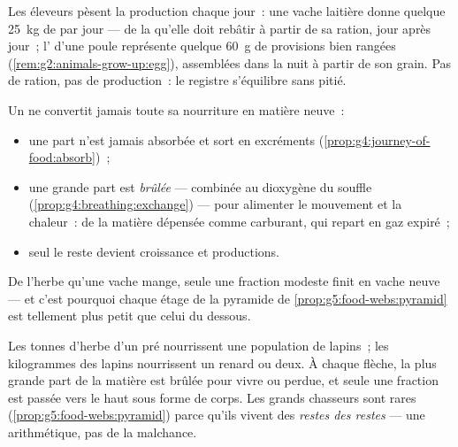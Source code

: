 \begin{example}\label{ex:g6:matter-from-food:weighing}
Les éleveurs pèsent la production chaque jour~: une vache laitière
donne quelque \qty{25}{kg} de  par jour --- de la  qu'elle doit rebâtir à partir de sa ration, jour après
jour~; l' d'une poule représente quelque \qty{60}{g} de
provisions bien rangées (\cref{rem:g2:animals-grow-up:egg}),
assemblées dans la nuit à partir de son grain. Pas de ration, pas de
production~: le registre s'équilibre sans pitié.
\end{example}

\begin{proposition}\label{prop:g6:matter-from-food:losses}
Un  ne convertit jamais toute sa nourriture en matière
neuve~:
\begin{itemize}
  \item une part n'est jamais absorbée et sort en excréments
        (\cref{prop:g4:journey-of-food:absorb})~;
  \item une grande part est \emph{brûlée} --- combinée au
        dioxygène du souffle
        (\cref{prop:g4:breathing:exchange}) --- pour alimenter le
        mouvement et la chaleur~: de la matière dépensée comme
        carburant, qui repart en gaz expiré~;
  \item seul le reste devient croissance et productions.
\end{itemize}
De l'herbe qu'une vache mange, seule une fraction modeste finit en
vache neuve --- et c'est pourquoi chaque étage de la pyramide de
\cref{prop:g5:food-webs:pyramid} est tellement plus petit que celui
du dessous.
\end{proposition}
\admitted

\begin{example}\label{ex:g6:matter-from-food:pyramid}
Les tonnes d'herbe d'un pré nourrissent une population de lapins~;
les kilogrammes des lapins nourrissent un renard ou deux. À chaque
flèche, la plus grande part de la matière est brûlée pour vivre ou
perdue, et seule une fraction est passée vers le haut sous forme de
corps. Les grands chasseurs sont rares
(\cref{prop:g5:food-webs:pyramid}) parce qu'ils vivent des
\emph{restes des restes} --- une arithmétique, pas de la malchance.
\end{example}

